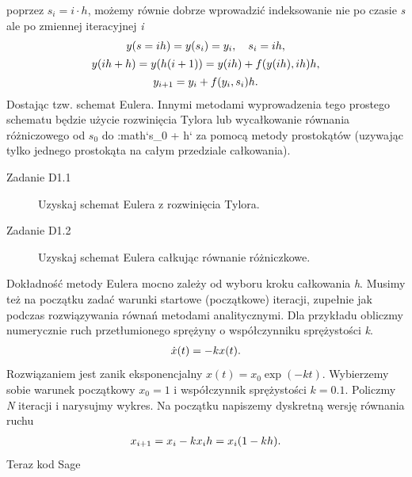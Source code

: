 \documentclass[a4paper,12pt,polish]{sphinxmanual}
\begin{document}
poprzez $s_i = i \cdot h$, możemy równie dobrze wprowadzić indeksowanie nie po czasie \emph{s} ale
po zmiennej iteracyjnej \emph{i}
\begin{gather}
\begin{split}y (s = ih) = y(s_i) = y_i, \quad s_i = i h,\end{split}\notag\\\begin{split}y (i h + h) = y(h(i+1)) = y(ih) + f(y(ih), ih) h,\end{split}\notag\\\begin{split}y_{i+1} = y_i + f(y_i,s_i) h.\end{split}\notag
\end{gather}
Dostając tzw. schemat Eulera. Innymi metodami wyprowadzenia tego prostego schematu będzie użycie
rozwinięcia Tylora lub wycałkowanie równania różniczowego od $s_0$ do :math{}`s\_0 + h{}`
za pomocą metody prostokątów (uzywając tylko jednego prostokąta na całym przedziale całkowania).
\begin{description}
\item[{Zadanie D1.1}] \leavevmode
Uzyskaj schemat Eulera z rozwinięcia Tylora.

\item[{Zadanie D1.2}] \leavevmode
Uzyskaj schemat Eulera całkując równanie różniczkowe.

\end{description}

Dokładność metody Eulera mocno zależy od wyboru kroku całkowania \emph{h}. Musimy też na początku zadać
warunki startowe (początkowe) iteracji, zupełnie jak podczas rozwiązywania równań metodami analitycznymi.
Dla przykładu obliczmy numerycznie ruch przetłumionego sprężyny o współczynniku sprężystości \emph{k}.
\begin{gather}
\begin{split}\dot{x}(t) = -k x(t).\end{split}\notag
\end{gather}
Rozwiązaniem jest zanik eksponencjalny $x(t) = x_0 \exp (-k t)$. Wybierzemy sobie warunek początkowy
$x_0 = 1$ i współczynnik sprężystości $k=0.1$. Policzmy \emph{N} iteracji i narysujmy wykres. Na
początku napiszemy dyskretną wersję równania ruchu
\begin{gather}
\begin{split}x_{i+1} = x_{i} - k x_i h = x_i (1 - kh).\end{split}\notag
\end{gather}
Teraz kod Sage
\end{document}

